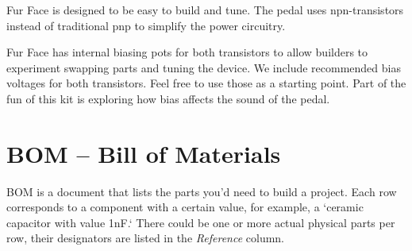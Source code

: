 \documentclass[a4paper,12pt]{article}
\begin{document}
Fur Face is designed to be easy to build and tune. The pedal
uses npn-transistors instead of traditional pnp to simplify
the power circuitry.

Fur Face has internal biasing pots for both transistors to
allow builders to experiment swapping parts and tuning the
device. We include recommended bias voltages for both
transistors. Feel free to use those as a starting point.
Part of the fun of this kit is exploring how bias affects
the sound of the pedal.

\pagebreak

\section{BOM – Bill of Materials}

BOM is a document that lists the parts you'd need to build a
project. Each row corresponds to a component with a certain
value, for example, a `ceramic capacitor with value 1nF.`
There could be one or more actual physical parts per
row, their designators are listed in the \textit{Reference}
column.




\end{document}
